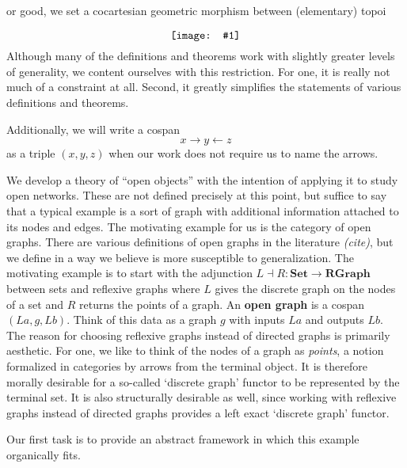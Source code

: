 \documentclass{amsart}
\newcommand{\Set}{\cat{Set}}
\newcommand{\RGraph}{\cat{RGraph}}
\newcommand{\defn}[1]{\textbf{#1}}
\newcommand{\cat}[1]{\mathbf{#1}}
\newcommand{\from}{\colon}
\newcommand{\diagram}[1]{\raisebox{-0.5\height}{\texttt{[image: \#1]}}}
\newenvironment{exposition}[1]{}{}
\theoremstyle{remark}
\theoremstyle{definition}
\begin{document}

\begin{exposition}

  For good, we set a cocartesian geometric morphism between
  (elementary) topoi
  \[
    \diagram{diag_oo_geometric-morphism}
  \]
  Although many of the definitions and theorems work with slightly
  greater levels of generality, we content ourselves with this
  restriction. For one, it is really not much of a constraint at
  all. Second, it greatly simplifies the statements of various
  definitions and theorems.  
  
  Additionally, we will write a cospan
  \[
    x \to y \gets z
  \]
  as a triple \( (x,y,z) \) when our work does not require us to name
  the arrows.
  
\end{exposition}
  
  
\begin{exposition}{}
  
  We develop a theory of ``open objects'' with the intention of
  applying it to study open networks.  These are not defined precisely
  at this point, but suffice to say that a typical example is a sort
  of graph with additional information attached to its nodes and
  edges.  The motivating example for us is the category of open
  graphs.  There are various definitions of open graphs in the
  literature \emph{(cite)}, but we define in a way we believe is more
  susceptible to generalization.  The motivating example is to start
  with the adjunction $ L \dashv R \from \Set \to \RGraph $
  between sets and reflexive graphs where $ L $ gives the
  discrete graph on the nodes of a set and $ R $ returns the points of
  a graph.  An \defn{open graph} is a cospan
  $ ( La , g , Lb ) $.  Think of this data as a
  graph $ g $ with inputs $ La $ and outputs $ Lb $.
  The reason for choosing reflexive graphs instead of directed graphs
  is primarily aesthetic.  For one, we like to think of the nodes of a
  graph as \emph{points}, a notion formalized in categories by arrows
  from the terminal object.  It is therefore morally desirable for a
  so-called `discrete graph' functor to be represented by the terminal
  set. It is also structurally desirable as well, since working with
  reflexive graphs instead of directed graphs provides a left exact
  `discrete graph' functor.
 
  Our first task is to provide an abstract framework in which this
  example organically fits.

\end{exposition}
\end{document}
